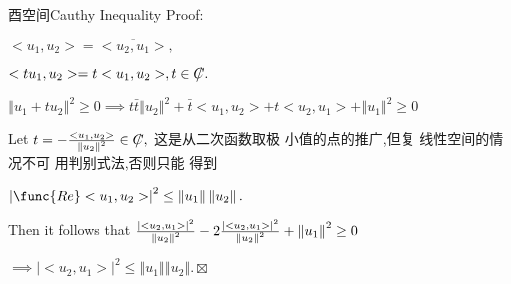 \documentclass{article}
\begin{document}
酉空间Cauthy Inequality Proof:

$<u_{1},u_{2}>=\overline{<u_{2},u_{1}>},$

$<tu_{1},u_{2}>=t<u_{1},u_{2}>,t\in \NEG{C}.$

$\left\Vert u_{1}+tu_{2}\right\Vert ^{2}\geq 0\implies t\bar{t}\left\Vert
u_{2}\right\Vert ^{2}+\bar{t}<u_{1},u_{2}>+t<u_{2},u_{1}>+\left\Vert
u_{1}\right\Vert ^{2}\geq 0$

Let $t=-\frac{<u_{1},u_{2}>}{\left\Vert u_{2}\right\Vert ^{2}}\in \NEG{C},$%
这是从二次函数取极%
小值的点的推广,但复%
线性空间的情况不可%
用判别式法,否则只能%
得到

$\left\vert \func{Re}<u_{1},u_{2}>\right\vert ^{2}\leq \left\Vert
u_{1}\right\Vert \left\Vert u_{2}\right\Vert .$

Then it follows that $\frac{\left\vert <u_{2},u_{1}>\right\vert ^{2}}{%
\left\Vert u_{2}\right\Vert ^{2}}-2\frac{\left\vert <u_{2},u_{1}>\right\vert
^{2}}{\left\Vert u_{2}\right\Vert ^{2}}+\left\Vert u_{1}\right\Vert ^{2}\geq
0$

$\implies \left\vert <u_{2},u_{1}>\right\vert ^{2}\leq \left\Vert
u_{1}\right\Vert \left\Vert u_{2}\right\Vert .\boxtimes $
\end{document}
